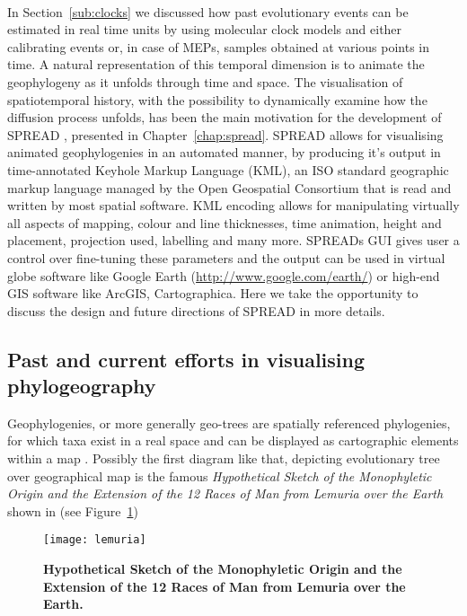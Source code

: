 \paragraph{}
In Section~\ref{sub:clocks} we discussed how past evolutionary events can be estimated in real time units by using molecular clock models and either calibrating events or, in case of MEPs, samples obtained at various points in time.
A natural representation of this temporal dimension is to animate the geophylogeny as it unfolds through time and space.
The visualisation of spatiotemporal history, with the possibility to dynamically examine how the diffusion process unfolds, has been the main motivation for the development of SPREAD \citep{Bielejec2011}, presented in Chapter~\ref{chap:spread}.
SPREAD allows for visualising animated geophylogenies in an automated manner, by producing it's output in time-annotated Keyhole Markup Language (KML), an ISO standard geographic markup language managed by the Open Geospatial Consortium that is read and written by most spatial software. 
KML encoding allows for manipulating virtually all aspects of mapping, colour and line thicknesses, time animation, height and placement, projection used, labelling and many more.
SPREADs GUI gives user a control over fine-tuning these parameters and the output can be used in virtual globe software like Google Earth (\url{http://www.google.com/earth/}) or high-end GIS software like ArcGIS, Cartographica.
Here we take the opportunity to discuss the design and future directions of SPREAD in more details.

\subsection{Past and current efforts in visualising phylogeography}

Geophylogenies, or more generally geo-trees are spatially referenced phylogenies, for which taxa exist in a real space and can be displayed as cartographic elements within a map \citep{Kidd2010}.   
Possibly the first diagram like that, depicting evolutionary tree over geographical map is the famous \textit{Hypothetical Sketch of the Monophyletic Origin and the Extension of the 12 Races of Man from Lemuria over the Earth} shown in \cite{Haeckel1876} (see Figure~\ref{fig:lemuria})

\begin{figure}[H]
\centering
\texttt{[image: lemuria]}
\caption{
{ \footnotesize 
{\bf Hypothetical Sketch of the Monophyletic Origin and the Extension of the 12 Races of Man from Lemuria over the Earth.} 
} %
}
\label{fig:lemuria}
\end{figure}

